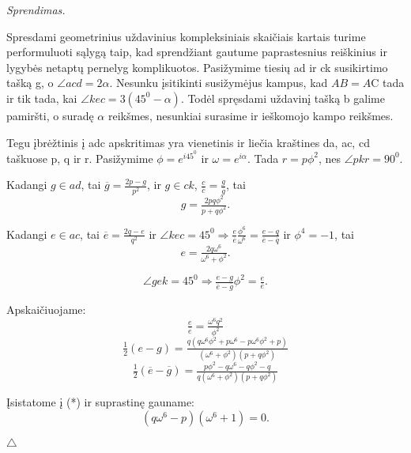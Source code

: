 \documentclass[11pt,a4paper,twoside]{book}
\newenvironment{sprendimas}{\noindent \textit{Sprendimas.}}{\hfill $\triangle$}
\theoremstyle{definition} \newtheorem*{api}{Apibrėžimas}
\theoremstyle{remark} \newtheorem*{pastaba}{Pastaba}
\begin{document}
\begin{sprendimas}

Spresdami geometrinius uždavinius kompleksiniais skaičiais kartais turime performuluoti sąlygą taip, kad sprendžiant gautume paprastesnius reiškinius ir lygybės netaptų pernelyg komplikuotos. Pasižymime tiesių ad ir ck susikirtimo tašką g, o $\angle acd = 2\alpha$. Nesunku įsitikinti susižymėjus kampus, kad $AB=A$C tada ir tik tada, kai $\angle kec=3(45^0-\alpha)$. Todėl spręsdami uždavinį tašką b galime pamiršti, o suradę $\alpha$ reikšmes, nesunkiai surasime ir ieškomojo kampo reikšmes.

Tegu įbrėžtinis į adc apskritimas yra vienetinis ir liečia kraštines da, ac, cd  taškuose p, q ir r. Pasižymime $\phi=e^{i45^0}$ ir $\omega=e^{i\alpha}$. Tada $r=p\phi^2$, nes $\angle pkr=90^0$.

Kadangi $g\in ad$, tai $\overline{g}=\tfrac{2p-g}{p^2}$, ir $g\in ck$, $\tfrac{c}{\overline{c}}=\tfrac{g}{\overline{g}}$, tai
\begin{equation*}
g=\tfrac{2pq\phi ^2}{p+q\phi^2}.
\end{equation*}

Kadangi $e\in ac$, tai $\overline{e}=\tfrac{2q-e}{q^2}$ ir $\angle kec=45^0 \Rightarrow  \tfrac{e}{\overline{e}}\tfrac{\phi^6}{\omega^6}= \tfrac{e-q}{\overline{e}-\overline{q}}$ ir $\phi^4=-1$, tai
\begin{equation*}
e=\tfrac{2q\omega^6}{\omega^6 +\phi ^2}.
\end{equation*}

\begin{equation*}
\angle gek = 45^0 \Rightarrow \tfrac{e-g}{\overline{e}-\overline{g}}\phi^2=\tfrac{e}{\overline{e}}.\tag{*}
\end{equation*}

Apskaičiuojame:
\begin{equation*}
\tfrac{e}{\overline{e}}= \tfrac{\omega^6q^2}{\phi^2} 
\end{equation*}
\begin{equation*}
\tfrac{1}{2}(e-g)=\tfrac{q(q\omega^6\phi^2 +p\omega^6 -p\omega^6\phi^2 +p)}{(\omega^6+\phi^2)(p +q\phi^2)}
\end{equation*}
\begin{equation*}
\tfrac{1}{2}(\overline{e}-\overline{g})=\tfrac{p\phi^2 -q\omega^6 -q\phi^2 - q}{q(\omega^6+\phi^2)(p +q\phi^2)}
\end{equation*}

Įsistatome į (*) ir suprastinę gauname:
\begin{equation*}
(q\omega^6 -p)(\omega^6+1)=0. \tag{**}
\end{equation*}


\end{sprendimas}
\end{document}
